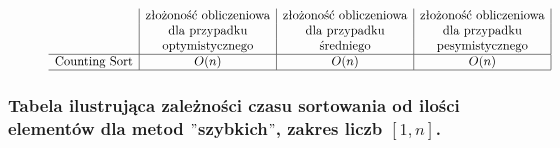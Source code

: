 \documentclass[polish,polish,a4paper]{article}
\begin{document}
\begin{spacing}{1.5}
\begin{figure}[H]
	\begin{equation*}
	\begin{array}{l|c|c|c|}

	&$złożoność obliczeniowa$&$złożoność obliczeniowa$&$złożoność obliczeniowa$\\
	&$dla przypadku$&$dla przypadku$&$dla przypadku$\\
	&$optymistycznego$&$średniego$&$pesymistycznego$\\
	\hline
	$Counting Sort$&O(n)&O(n)&O(n)\\
	\hline
	\end{array}
	\end{equation*}
\end{figure}

	\subsubsection*{Tabela ilustrująca zależności czasu sortowania od ilości elementów dla metod $"$szybkich$"$, zakres liczb $ [1,n] $.}

\begin{figure}[H]
	\begin{equation*}
	\begin{array}{l|c|c|c|c|}
	

\end{array}
\end{equation*}
\end{figure}
\end{spacing}
\end{document}

